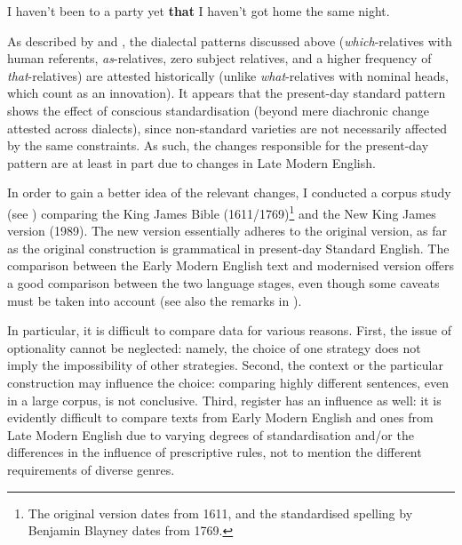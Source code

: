 \ea I haven't been to a party yet \textbf{that} I haven't got home the same night. \label{partythat}
\z

As described by \citet{kortmannwagner2007} and \citet{herrmann2005}, the dialectal patterns discussed above (\textit{which}-relatives with human referents, \textit{as}-relatives, zero subject relatives, and a higher frequency of \textit{that}-relatives) are attested historically (unlike \textit{what}-relatives with nominal heads, which count as an innovation). It appears that the present-day standard pattern shows the effect of conscious standardisation (beyond mere diachronic change attested across dialects), since non-standard varieties are not necessarily affected by the same constraints. As such, the changes responsible for the present-day pattern are at least in part due to changes in Late Modern English. 

In order to gain a better idea of the relevant changes, I conducted a corpus study (see \citealt{bacskaiatkari2020lmec}) comparing the King James Bible (1611/1769)\footnote{The original version dates from 1611, and the standardised spelling by Benjamin Blayney dates from 1769.} and the New King James version (1989). The new version essentially adheres to the original version, as far as the original construction is grammatical in present-day Standard English. The comparison between the Early Modern English text and modernised version offers a good comparison between the two language stages, even though some caveats must be taken into account (see also the remarks in ).

In particular, it is difficult to compare data for various reasons. First, the issue of optionality cannot be neglected: namely, the choice of one strategy does not imply the impossibility of other strategies. Second, the context or the particular construction may influence the choice: comparing highly different sentences, even in a large corpus, is not conclusive. Third, register has an influence as well: it is evidently difficult to compare texts from Early Modern English and ones from Late Modern English due to varying degrees of standardisation and/or the differences in the influence of prescriptive rules, not to mention the different requirements of diverse genres.

